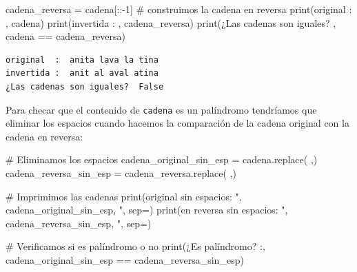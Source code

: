 \documentclass[
  spanish,
  letterpaper,
]{scrbook}
\newenvironment{Shaded}{\begin{snugshade}}{\end{snugshade}}
\newcommand{\BuiltInTok}[1]{\textcolor[rgb]{0.00,0.23,0.31}{#1}}
\newcommand{\CommentTok}[1]{\textcolor[rgb]{0.37,0.37,0.37}{#1}}
\newcommand{\DecValTok}[1]{\textcolor[rgb]{0.68,0.00,0.00}{#1}}
\newcommand{\NormalTok}[1]{\textcolor[rgb]{0.00,0.23,0.31}{#1}}
\newcommand{\OperatorTok}[1]{\textcolor[rgb]{0.37,0.37,0.37}{#1}}
\newcommand{\StringTok}[1]{\textcolor[rgb]{0.13,0.47,0.30}{#1}}
\theoremstyle{definition}
\theoremstyle{remark}
\begin{document}
\begin{Shaded}
\begin{Highlighting}[]
\NormalTok{cadena\_reversa }\OperatorTok{=}\NormalTok{ cadena[::}\OperatorTok{{-}}\DecValTok{1}\NormalTok{] }\CommentTok{\# construimos la cadena en reversa}
\BuiltInTok{print}\NormalTok{(}\StringTok{\textquotesingle{}original  : \textquotesingle{}}\NormalTok{, cadena)}
\BuiltInTok{print}\NormalTok{(}\StringTok{\textquotesingle{}invertida : \textquotesingle{}}\NormalTok{, cadena\_reversa)}
\BuiltInTok{print}\NormalTok{(}\StringTok{\textquotesingle{}¿Las cadenas son iguales? \textquotesingle{}}\NormalTok{, cadena }\OperatorTok{==}\NormalTok{ cadena\_reversa)}
\end{Highlighting}
\end{Shaded}

\begin{verbatim}
original  :  anita lava la tina
invertida :  anit al aval atina
¿Las cadenas son iguales?  False
\end{verbatim}

Para checar que el contenido de \texttt{cadena} es un palíndromo
tendríamos que eliminar los espacios cuando hacemos la comparación de la
cadena original con la cadena en reversa:

\begin{Shaded}
\begin{Highlighting}[]
\CommentTok{\# Eliminamos los espacios}
\NormalTok{cadena\_original\_sin\_esp }\OperatorTok{=}\NormalTok{ cadena.replace(}\StringTok{\textquotesingle{} \textquotesingle{}}\NormalTok{,}\StringTok{\textquotesingle{}\textquotesingle{}}\NormalTok{)}
\NormalTok{cadena\_reversa\_sin\_esp }\OperatorTok{=}\NormalTok{ cadena\_reversa.replace(}\StringTok{\textquotesingle{} \textquotesingle{}}\NormalTok{,}\StringTok{\textquotesingle{}\textquotesingle{}}\NormalTok{)}

\CommentTok{\# Imprimimos las cadenas}
\BuiltInTok{print}\NormalTok{(}\StringTok{\textquotesingle{}original sin espacios: "\textquotesingle{}}\NormalTok{, cadena\_original\_sin\_esp, }\StringTok{\textquotesingle{}"\textquotesingle{}}\NormalTok{, sep}\OperatorTok{=}\StringTok{\textquotesingle{}\textquotesingle{}}\NormalTok{)}
\BuiltInTok{print}\NormalTok{(}\StringTok{\textquotesingle{}en reversa sin espacios: "\textquotesingle{}}\NormalTok{, cadena\_reversa\_sin\_esp, }\StringTok{\textquotesingle{}"\textquotesingle{}}\NormalTok{, sep}\OperatorTok{=}\StringTok{\textquotesingle{}\textquotesingle{}}\NormalTok{)}

\CommentTok{\# Verificamos si es palíndromo o no}
\BuiltInTok{print}\NormalTok{(}\StringTok{\textquotesingle{}¿Es palíndromo? :\textquotesingle{}}\NormalTok{, cadena\_original\_sin\_esp }\OperatorTok{==}\NormalTok{ cadena\_reversa\_sin\_esp)}
\end{Highlighting}
\end{Shaded}
\end{document}
